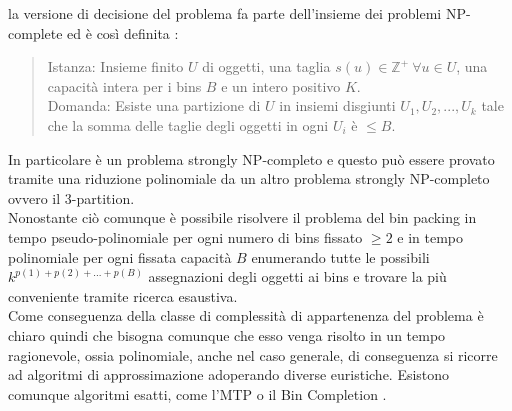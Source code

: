 la versione di decisione del problema fa parte dell'insieme dei problemi NP-complete ed è così definita \cite{CaI_NP}:
\begin{quote}
	Istanza: Insieme finito $ U $ di oggetti, una taglia $ s(u) \in \mathbb{Z}^+ \: \forall u \in U $, una capacità intera
	per i bins $ B $ e un intero positivo $ K $. \\
	Domanda: Esiste una partizione di $ U $ in insiemi disgiunti $ U_1, U_2, ..., U_k $ tale che la somma delle taglie degli
	oggetti in ogni $ U_i $ è $ \leq B $.
\end{quote}
In particolare è un problema strongly NP-completo e questo può essere provato tramite una riduzione polinomiale da un altro
problema strongly NP-completo ovvero il 3-partition. \\
Nonostante ciò comunque è possibile risolvere il problema del bin packing in tempo pseudo-polinomiale per ogni numero di
bins fissato $ \geq 2 $ \cite{BinPackingFixedSize} e in tempo polinomiale per
ogni fissata capacità $ B $ enumerando tutte le possibili $ k^{p(1) + p(2) + ... + p(B)} $ assegnazioni degli oggetti ai
bins e trovare la più conveniente tramite ricerca esaustiva. \\
Come conseguenza della classe di complessità di appartenenza del problema è chiaro quindi che bisogna comunque che esso
venga risolto in un tempo ragionevole, ossia polinomiale, anche nel caso generale, di conseguenza si ricorre ad algoritmi
di approssimazione adoperando diverse euristiche.
Esistono comunque algoritmi esatti, come l'MTP \cite{MTP} o il Bin Completion \cite{BinCompletion}.